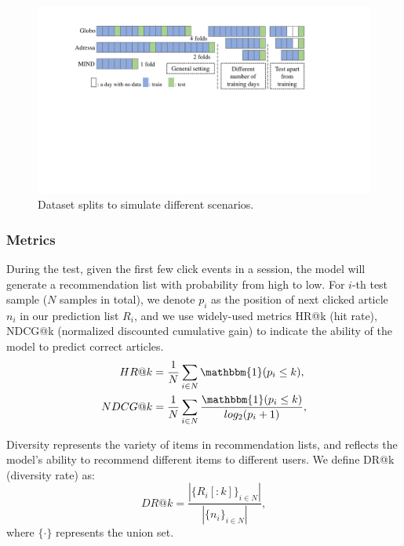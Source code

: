 \begin{figure}[th]
  \centering
  \includegraphics[width=\columnwidth]{fig/data_split.pdf}
  \caption{Dataset splits to simulate different scenarios.}
  \label{fig:data_split}
\end{figure}

\subsubsection{Metrics}
During the test, given the first few click events in a session, the model will generate a recommendation list with probability from high to low. For $i$-th test sample ($N$ samples in total), we denote $p_i$ as the position of next clicked article $n_i$ in our prediction list $R_i$, and we use widely-used metrics HR@k (hit rate), NDCG@k (normalized discounted cumulative gain) to indicate the ability of the model to predict correct articles. 
\begin{equation}
  \begin{split}
    HR@k &= \frac{1}{N}\sum_{i\in N}\mathbbm{1}(p_i\leq k), \\
    NDCG@k &= \frac{1}{N}\sum_{i\in N}\frac{\mathbbm{1}(p_i\leq k)}{log_2(p_i+1)}, 
  \end{split}  
\end{equation}

Diversity represents the variety of items in recommendation lists, and reflects the model's
ability to recommend different items to different users. 
We define DR@k (diversity rate) as:
\begin{equation}
  DR@k = \frac{|\{R_i[:k]\}_{i\in N}|}{|\{n_i\}_{i\in N}|},
\end{equation}
where $\{\cdot\}$ represents the union set.
